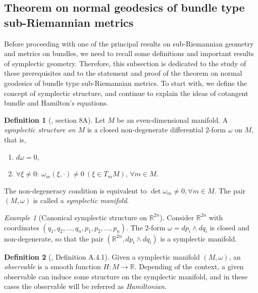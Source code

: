 \documentclass[12pt, letterpaper, reqno]{amsart}
\theoremstyle{definition}
\newtheorem{df}{Definition}
\theoremstyle{plain}
\theoremstyle{remark}
\newtheorem{ex}{Example}
\begin{document}
\subsection{Theorem on normal geodesics of bundle type sub-Riemannian metrics}
\label{sub:theorem_on_normal_geodesics}
Before proceeding with one of the principal results on sub-Riemannian geometry and metrics on bundles, we need to recall some definitions and important results of symplectic geometry. Therefore, this subsection is dedicated to the study of these prerequisites and to the statement and proof of the theorem on normal geodesics of bundle type sub-Riemannian metrics. To start with, we define the concept of symplectic structure, and continue to explain the ideas of cotangent bundle and Hamilton's equations.
\begin{df}[\cite{arnol2013mathematical}, section 8A]
	Let $ M $ be an even-dimensional manifold. A \textit{symplectic structure on $ M $ } is a closed non-degenerate differential 2-form $ \omega $ on $ M $, that is, 
	\begin{enumerate}
		\item $ d\omega=0 $,
		\item $\forall \xi \neq 0: \ \omega_m(\xi,\cdot)\neq0 \ (\xi\in T_m M)$, $ \forall m \in M. $  
	  
	\end{enumerate}
	The non-degeneracy condition is equivalent to $ \operatorname{det} \omega_m\neq 0, \forall m\in M $. The pair $ (M,\omega) $ is called a \textit{symplectic manifold}. 
\end{df}

\begin{ex}[Canonical symplectic structure on $ \mathbb{R}^{2n}$]
	Consider $ \mathbb{R}^{2n} $ with coordinates $ (q_1,q_2,\dots,q_n,p_1,p_2,\dots,p_n) $. The 2-form $ \omega = dp_i\wedge dq_i $ is closed and non-degenerate, so that the pair $ ( \mathbb{R}^{2n}, dp_i\wedge dq_i) $ is a symplectic manifold.  
\end{ex}

\begin{df}[\cite{montgomery2002tour}, Definition A.4.1]
	Given a symplectic manifold  $ (M,\omega) $, an \textit{observable} is a smooth function $ H: M \rightarrow \mathbb{R}. $ Depending of the context, a given observable can induce some structure on the symplectic manifold, and in these cases the observable will be referred as \textit{Hamiltonian.} 
\end{df}
\end{document}
